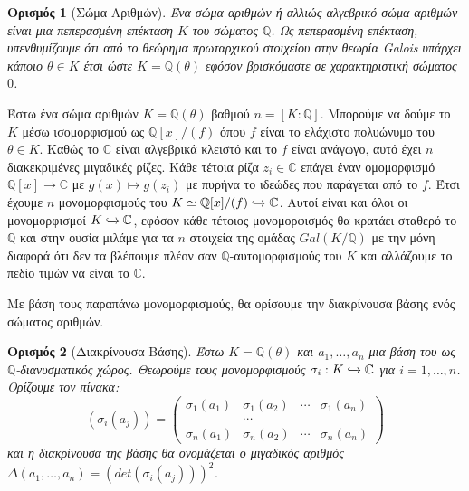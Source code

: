 \documentclass[oneside,a4paper]{article}
\newtheorem*{defn}{Ορισμός}
\newcommand {\tl}{\textlatin}
\newcommand{\Q}{\mathbb{Q}}
\begin{document}
\begin{defn}[Σώμα Αριθμών]
	Ένα σώμα αριθμών ή αλλιώς αλγεβρικό σώμα αριθμών είναι μια πεπερασμένη επέκταση $K$ του σώματος $\Q$. Ως πεπερασμένη επέκταση, υπενθυμίζουμε ότι από το θεώρημα πρωταρχικού στοιχείου στην θεωρία \tl{Galois} υπάρχει κάποιο $\theta \in K$ έτσι ώστε $K=\Q(\theta)$ εφόσον βρισκόμαστε σε χαρακτηριστική σώματος $0$.
\end{defn}


\noindent Έστω ένα σώμα αριθμών $K=\Q(\theta)$ βαθμού $n = [K:\Q]$. Μπορούμε να δούμε το $K$ μέσω ισομορφισμού ως $\Q[x]/(f)$ όπου $f$ είναι το ελάχιστο πολυώνυμο του $\theta \in K$. Καθώς το $\mathbb{C}$ είναι αλγεβρικά κλειστό και το $f$ είναι ανάγωγο, αυτό έχει $n$ διακεκριμένες μιγαδικές ρίζες. Κάθε τέτοια ρίζα $z_i \in \mathbb{C}$ επάγει έναν ομομορφισμό $\Q[x] \rightarrow \mathbb{C}$ με $g(x) \mapsto g(z_i)$ με πυρήνα το ιδεώδες που παράγεται από το $f$. Έτσι έχουμε $n$ μονομορφισμούς του $K\simeq \Q[x]/(f) \xhookrightarrow{} \mathbb{C}$. Αυτοί είναι και όλοι οι μονομορφισμοί $K\xhookrightarrow{} \mathbb{C}$, εφόσον κάθε τέτοιος μονομορφισμός θα κρατάει σταθερό το $\Q$ και στην ουσία μιλάμε για τα $n$ στοιχεία της ομάδας $Gal(K/\Q)$ με την μόνη διαφορά ότι δεν τα βλέπουμε πλέον σαν $\Q$-αυτομορφισμούς του $K$ και αλλάζουμε το πεδίο τιμών να είναι το $\mathbb{C}$. 

\noindent Με βάση τους παραπάνω μονομορφισμούς, θα ορίσουμε την διακρίνουσα βάσης ενός σώματος αριθμών.

\begin{defn}[Διακρίνουσα Βάσης]
	Έστω $K=\Q(\theta)$ και $a_1,\ldots,a_n$ μια βάση του ως $\Q$-διανυσματικός χώρος. Θεωρούμε τους μονομορφισμούς $\sigma_i : K \xhookrightarrow{} \mathbb{C}$ για $i=1,\ldots,n$. Ορίζουμε τον πίνακα:
	$$(\sigma_i(a_j)) = \begin{pmatrix}
		\sigma_1 (a_1) & \sigma_1 (a_2) & \cdots & \sigma_1 (a_n) \\
		 & \cdots & & \\
		 \sigma_n (a_1) & \sigma_n(a_2) & \cdots & \sigma_n(a_n)
	\end{pmatrix}$$ και η διακρίνουσα της βάσης θα ονομάζεται ο μιγαδικός αριθμός $\Delta(a_1,\ldots,a_n) = (det(\sigma_i(a_j)))^2$.
\end{defn}
\end{document}
